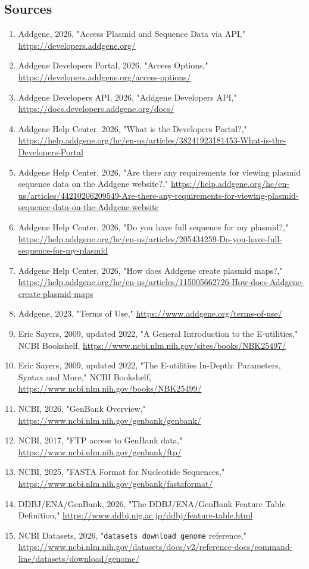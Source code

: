 \documentclass[11pt]{report}
\begin{document}
\subsection{Sources}
\begin{enumerate}
\item Addgene, 2026, "Access Plasmid and Sequence Data via API," \url{https://developers.addgene.org/}
\item Addgene Developers Portal, 2026, "Access Options," \url{https://developers.addgene.org/access-options/}
\item Addgene Developers API, 2026, "Addgene Developers API," \url{https://docs.developers.addgene.org/docs/}
\item Addgene Help Center, 2026, "What is the Developers Portal?," \url{https://help.addgene.org/hc/en-us/articles/38241923181453-What-is-the-Developers-Portal}
\item Addgene Help Center, 2026, "Are there any requirements for viewing plasmid sequence data on the Addgene website?," \url{https://help.addgene.org/hc/en-us/articles/44210206209549-Are-there-any-requirements-for-viewing-plasmid-sequence-data-on-the-Addgene-website}
\item Addgene Help Center, 2026, "Do you have full sequence for my plasmid?," \url{https://help.addgene.org/hc/en-us/articles/205434259-Do-you-have-full-sequence-for-my-plasmid}
\item Addgene Help Center, 2026, "How does Addgene create plasmid maps?," \url{https://help.addgene.org/hc/en-us/articles/115005662726-How-does-Addgene-create-plasmid-maps}
\item Addgene, 2023, "Terms of Use," \url{https://www.addgene.org/terms-of-use/}
\item Eric Sayers, 2009, updated 2022, "A General Introduction to the E-utilities," NCBI Bookshelf, \url{https://www.ncbi.nlm.nih.gov/sites/books/NBK25497/}
\item Eric Sayers, 2009, updated 2022, "The E-utilities In-Depth: Parameters, Syntax and More," NCBI Bookshelf, \url{https://www.ncbi.nlm.nih.gov/books/NBK25499/}
\item NCBI, 2026, "GenBank Overview," \url{https://www.ncbi.nlm.nih.gov/genbank/genbank/}
\item NCBI, 2017, "FTP access to GenBank data," \url{https://www.ncbi.nlm.nih.gov/genbank/ftp/}
\item NCBI, 2025, "FASTA Format for Nucleotide Sequences," \url{https://www.ncbi.nlm.nih.gov/genbank/fastaformat/}
\item DDBJ/ENA/GenBank, 2026, "The DDBJ/ENA/GenBank Feature Table Definition," \url{https://www.ddbj.nig.ac.jp/ddbj/feature-table.html}
\item NCBI Datasets, 2026, "\texttt{datasets download genome} reference," \url{https://www.ncbi.nlm.nih.gov/datasets/docs/v2/reference-docs/command-line/datasets/download/genome/}
\end{enumerate}
\end{document}
